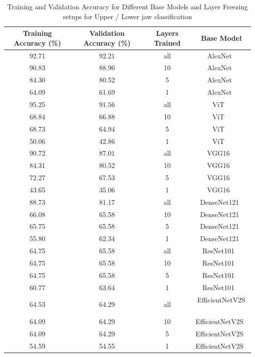 \documentclass[english,twoside,openright]{UH_DS_MSc}
\begin{document}
\begin{table}[ht]
    \centering
        \begin{tabular}{|c|c|c|c|}
            \hline
            \textbf{Training Accuracy (\%)} & \textbf{Validation Accuracy (\%)} & \textbf{Layers Trained} & \textbf{Base Model} \\ \hline
            92.71 & $\mathbf{92.21}$ & all  & AlexNet~\cite{alexnet}       \\\hline
            90.83 & 88.96 & 10   & AlexNet~\cite{alexnet}      \\\hline
            84.30 & 80.52 & 5    & AlexNet~\cite{alexnet}      \\\hline
            64.09 & 61.69 & 1    & AlexNet~\cite{alexnet}      \\\hline
            95.25 & $\mathbf{91.56}$ & all  & ViT ~\cite{vit}         \\\hline
            68.84 & 66.88 & 10   & ViT ~\cite{vit}         \\\hline
            68.73 & 64.94 & 5    & ViT ~\cite{vit}         \\\hline
            50.06 & 42.86 & 1    & ViT ~\cite{vit}         \\\hline
            90.72 & $\mathbf{87.01}$ & all  & VGG16    ~\cite{vgg}    \\\hline
            84.31 & 80.52 & 10   & VGG16  ~\cite{vgg}      \\\hline
            72.27 & 67.53 & 5    & VGG16  ~\cite{vgg}      \\\hline
            43.65 & 35.06 & 1    & VGG16  ~\cite{vgg}      \\\hline
            88.73 & 81.17 & all  & DenseNet121~\cite{densenet}  \\\hline
            66.08 & 65.58 & 10   & DenseNet121~\cite{densenet}  \\\hline
            65.75 & 65.58 & 5    & DenseNet121~\cite{densenet}  \\\hline
            55.80 & 62.34 & 1    & DenseNet121~\cite{densenet}  \\\hline
            64.75 & 65.58 & all  & ResNet101 ~\cite{resnet}   \\ \hline
            64.75 & 65.58 & 10   & ResNet101  ~\cite{resnet}  \\\hline
            64.75 & 65.58 & 5    & ResNet101 ~\cite{resnet}   \\\hline
            60.77 & 63.64 & 1    & ResNet101 ~\cite{resnet}   \\\hline
            64.53 & 64.29 & all  & EfficientNetV2S ~\cite{efficientnetv2} \\\hline
            64.09 & 64.29 & 10   & EfficientNetV2S~\cite{efficientnetv2}  \\\hline
            64.09 & 64.29 & 5    & EfficientNetV2S~\cite{efficientnetv2}  \\\hline
            54.59 & 54.55 & 1    & EfficientNetV2S~\cite{efficientnetv2} \\\hline
        \end{tabular}
    \caption{Training and Validation Accuracy for Different Base Models and Layer Freezing setups for Upper / Lower jaw classification}
    \label{table:results}
\end{table}
\end{document}
